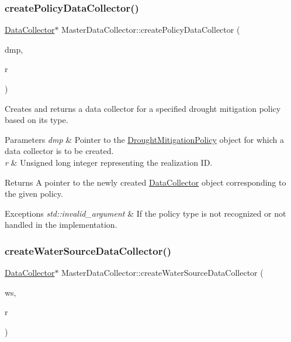\subsubsection{\texorpdfstring{create\+Policy\+Data\+Collector()}{createPolicyDataCollector()}}
{\footnotesize\ttfamily \mbox{\hyperlink{classDataCollector}{Data\+Collector}}$\ast$ Master\+Data\+Collector\+::create\+Policy\+Data\+Collector (\begin{DoxyParamCaption}\item[{\mbox{\hyperlink{classDroughtMitigationPolicy}{Drought\+Mitigation\+Policy}} $\ast$}]{dmp,  }\item[{unsigned long}]{r }\end{DoxyParamCaption})}



Creates and returns a data collector for a specified drought mitigation policy based on its type. 


\begin{DoxyParams}{Parameters}
{\em dmp} & Pointer to the {\ttfamily \mbox{\hyperlink{classDroughtMitigationPolicy}{Drought\+Mitigation\+Policy}}} object for which a data collector is to be created. \\
\hline
{\em r} & Unsigned long integer representing the realization ID.\\
\hline
\end{DoxyParams}
\begin{DoxyReturn}{Returns}
A pointer to the newly created {\ttfamily \mbox{\hyperlink{classDataCollector}{Data\+Collector}}} object corresponding to the given policy.
\end{DoxyReturn}

\begin{DoxyExceptions}{Exceptions}
{\em std\+::invalid\+\_\+argument} & If the policy type is not recognized or not handled in the implementation. \\
\hline
\end{DoxyExceptions}
\mbox{\label{classMasterDataCollector_a63dd98378c394b7c00508b44221d34aa}} 
\subsubsection{\texorpdfstring{create\+Water\+Source\+Data\+Collector()}{createWaterSourceDataCollector()}}
{\footnotesize\ttfamily \mbox{\hyperlink{classDataCollector}{Data\+Collector}}$\ast$ Master\+Data\+Collector\+::create\+Water\+Source\+Data\+Collector (\begin{DoxyParamCaption}\item[{\mbox{\hyperlink{classWaterSource}{Water\+Source}} $\ast$}]{ws,  }\item[{unsigned long}]{r }\end{DoxyParamCaption})}



